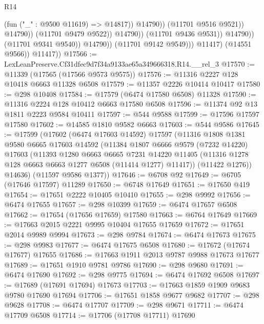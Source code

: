 \begin{lexlean}{R14}
\begin{coremodule}
                                              (fun ("_" : @9500 @11619) => @14817))
                                            @14790))
                                        (@11701 @9516 @9521))
                                      @14790))
                                  (@11701 @9479 @9522))
                                @14790))
                            (@11701 @9436 @9531))
                          @14790))
                      (@11701 @9341 @9540))
                    @14790))
                (@11701 @9142 @9549)))
            @11417)
          (@14551 @9566))
        @11417))
@17566 := LexLeanPreserve.Cf31dfec9d7f34a9133ae65a349666318.R14.__rel_3
@17570 := @11339 (@17565 (@17566 @9573 @9575))
@17576 := @11316 @2227 @128 @10418 @6663 @11328 @6508
@17579 := @11357 @2226 @10414 @10417
@17580 := @298 @10408
@17584 := @17579 (@6474 @17580 @6508) @11328
@17590 := @11316 @2224 @128 @10412 @6663 @17580 @6508
@17596 := @11374 @92 @13 @1811 @2223 @9584 @10411
@17597 := @544 @9588
@17599 := @17596 @17597 @17580
@17602 := @14585 @1810 @9582 @6663
@17603 := @544 @9586
@17645 := @17599
    (@17602
      (@6474 @17603 @14592)
      @17597
      (@11316
        @1808
        @1381
        @9580
        @6665
        @17603
        @14592
        (@11384
          @1807
          @6666
          @9579
          (@7232 @14220)
          @17603
          (@11393
            @1280
            @6663
            @6665
            @7231
            @14220
            @11405
            (@11316 @1278 @128 @6663 @6663 @1277 @6508 (@11414 @1277) @11417))
          (@11422 @1276))
        @14636)
      (@11597 @9586 @1377))
@17646 := @6708 @92
@17649 := @6705 (@17646 @17597) @11289
@17650 := @6748 @17649
@17651 := @17650 @419
@17654 := @17651 @2222 @10405 @10410
@17655 := @298 @9992
@17656 := @6474 @17655
@17657 := @298 @10399
@17659 := @6474 @17657 @6508
@17662 := @17654 (@17656 @17659) @17580
@17663 := @6764 @17649
@17669 := @17663 @2015 @2221 @9995 @10404 @17655 @17659
@17672 := @17651 @2014 @9989 @9994
@17673 := @298 @9784
@17674 := @6474 @17673
@17675 := @298 @9983
@17677 := @6474 @17675 @6508
@17680 := @17672 (@17674 @17677) @17655
@17686 := @17663 @1911 @2013 @9787 @9988 @17673 @17677
@17689 := @17651 @1910 @9781 @9786
@17690 := @298 @9680
@17691 := @6474 @17690
@17692 := @298 @9775
@17694 := @6474 @17692 @6508
@17697 := @17689 (@17691 @17694) @17673
@17703 := @17663 @1859 @1909 @9683 @9780 @17690 @17694
@17706 := @17651 @1858 @9677 @9682
@17707 := @298 @9628
@17708 := @6474 @17707
@17709 := @298 @9671
@17711 := @6474 @17709 @6508
@17714 := @17706 (@17708 @17711) @17690

\end{coremodule}
\end{lexlean}
